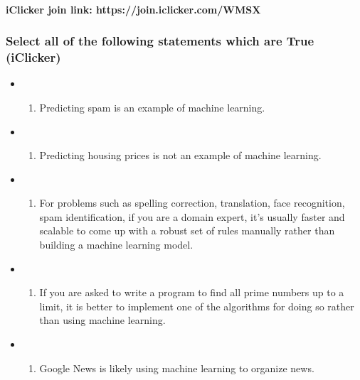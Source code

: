 \documentclass[11pt]{article}
\providecommand{\tightlist}{%
      \setlength{\itemsep}{0pt}\setlength{\parskip}{0pt}}
\begin{document}
\paragraph{iClicker join link:
https://join.iclicker.com/WMSX}\label{iclicker-join-link-httpsjoin.iclicker.comwmsx}

    \subsubsection{\texorpdfstring{Select all of the following statements
which are \textbf{True}
(iClicker)}{Select all of the following statements which are True (iClicker)}}\label{select-all-of-the-following-statements-which-are-true-iclicker}

\begin{itemize}
\tightlist
\item
  \begin{enumerate}
  \def\labelenumi{(\Alph{enumi})}
  \tightlist
  \item
    Predicting spam is an example of machine learning.
  \end{enumerate}
\item
  \begin{enumerate}
  \def\labelenumi{(\Alph{enumi})}
  \setcounter{enumi}{1}
  \tightlist
  \item
    Predicting housing prices is not an example of machine learning.
  \end{enumerate}
\item
  \begin{enumerate}
  \def\labelenumi{(\Alph{enumi})}
  \setcounter{enumi}{2}
  \tightlist
  \item
    For problems such as spelling correction, translation, face
    recognition, spam identification, if you are a domain expert, it's
    usually faster and scalable to come up with a robust set of rules
    manually rather than building a machine learning model.
  \end{enumerate}
\item
  \begin{enumerate}
  \def\labelenumi{(\Alph{enumi})}
  \setcounter{enumi}{3}
  \tightlist
  \item
    If you are asked to write a program to find all prime numbers up to
    a limit, it is better to implement one of the algorithms for doing
    so rather than using machine learning.
  \end{enumerate}
\item
  \begin{enumerate}
  \def\labelenumi{(\Alph{enumi})}
  \setcounter{enumi}{4}
  \tightlist
  \item
    Google News is likely using machine learning to organize news.
  \end{enumerate}
\end{itemize}
\end{document}
